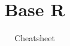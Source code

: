 \documentclass[final,hyperref={pdfpagelabels=false}]{beamer}
\title{Base R}
\subtitle{Cheatsheet}
\begin{document}
  
  \begin{frame}[fragile]{} 
    \vfill
    \begin{columns}[t]
      \begin{column}{.25\linewidth}
        \maketitle
        
      \end{column}
      
      \begin{column}{.25\linewidth}
        
      \end{column}
      
      \begin{column}{.50\linewidth}
        
      \end{column}
    \end{columns}
    \vfill
  \end{frame}
  
  \begin{frame}[fragile]{}
    \begin{columns}[t]
      \begin{column}{0.33\linewidth}
        
      \end{column}
      
      \begin{column}{0.33\linewidth}
        
      \end{column}
            
      \begin{column}{0.33\linewidth}
        
      \end{column}
    \end{columns}
  \end{frame}
\end{document}
